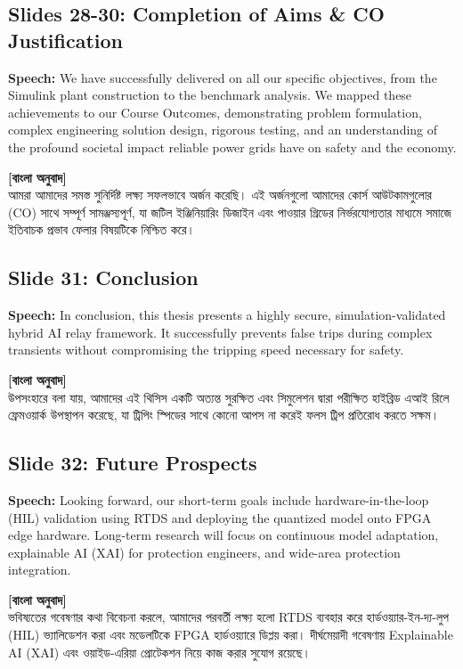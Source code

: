 \documentclass[12pt]{article}
\begin{document}
\subsection*{Slides 28-30: Completion of Aims \& CO Justification}
\textbf{Speech:} We have successfully delivered on all our specific objectives, from the Simulink plant construction to the benchmark analysis. We mapped these achievements to our Course Outcomes, demonstrating problem formulation, complex engineering solution design, rigorous testing, and an understanding of the profound societal impact reliable power grids have on safety and the economy.

\begin{bengali}
\textbf{[বাংলা অনুবাদ]} \\
আমরা আমাদের সমস্ত সুনির্দিষ্ট লক্ষ্য সফলভাবে অর্জন করেছি। এই অর্জনগুলো আমাদের কোর্স আউটকামগুলোর (CO) সাথে সম্পূর্ণ সামঞ্জস্যপূর্ণ, যা জটিল ইঞ্জিনিয়ারিং ডিজাইন এবং পাওয়ার গ্রিডের নির্ভরযোগ্যতার মাধ্যমে সমাজে ইতিবাচক প্রভাব ফেলার বিষয়টিকে নিশ্চিত করে।
\end{bengali}

\subsection*{Slide 31: Conclusion}
\textbf{Speech:} In conclusion, this thesis presents a highly secure, simulation-validated hybrid AI relay framework. It successfully prevents false trips during complex transients without compromising the tripping speed necessary for safety.

\begin{bengali}
\textbf{[বাংলা অনুবাদ]} \\
উপসংহারে বলা যায়, আমাদের এই থিসিস একটি অত্যন্ত সুরক্ষিত এবং সিমুলেশন দ্বারা পরীক্ষিত হাইব্রিড এআই রিলে ফ্রেমওয়ার্ক উপস্থাপন করেছে, যা ট্রিপিং স্পিডের সাথে কোনো আপস না করেই ফলস ট্রিপ প্রতিরোধ করতে সক্ষম।
\end{bengali}

\subsection*{Slide 32: Future Prospects}
\textbf{Speech:} Looking forward, our short-term goals include hardware-in-the-loop (HIL) validation using RTDS and deploying the quantized model onto FPGA edge hardware. Long-term research will focus on continuous model adaptation, explainable AI (XAI) for protection engineers, and wide-area protection integration.

\begin{bengali}
\textbf{[বাংলা অনুবাদ]} \\
ভবিষ্যতের গবেষণার কথা বিবেচনা করলে, আমাদের পরবর্তী লক্ষ্য হলো RTDS ব্যবহার করে হার্ডওয়্যার-ইন-দ্য-লুপ (HIL) ভ্যালিডেশন করা এবং মডেলটিকে FPGA হার্ডওয়্যারে ডিপ্লয় করা। দীর্ঘমেয়াদী গবেষণায় Explainable AI (XAI) এবং ওয়াইড-এরিয়া প্রোটেকশন নিয়ে কাজ করার সুযোগ রয়েছে।
\end{bengali}
\end{document}
